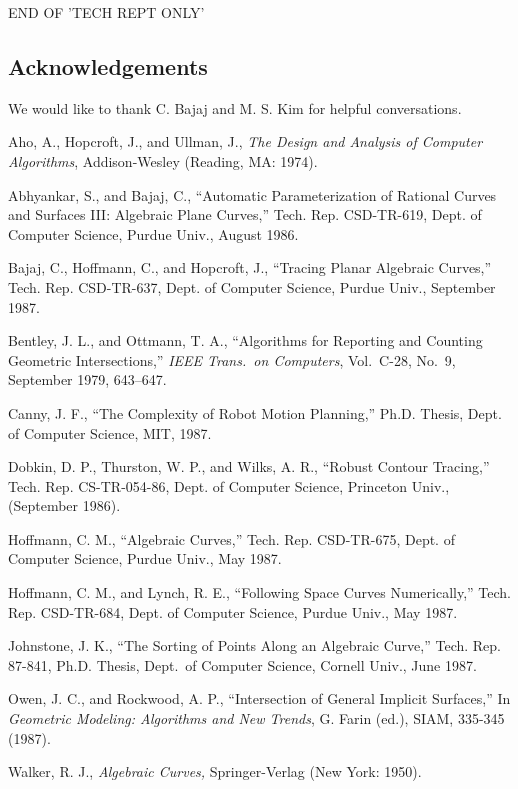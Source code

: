 END OF 'TECH REPT ONLY'
%
%
\fi

\SingleSpace
\subsection*{Acknowledgements}
We would like to thank C. Bajaj and M. S. Kim for helpful conversations.
%
\begin{thebibliography}{88}

 Aho, A., Hopcroft, J., and Ullman, J.,
{\it The Design and Analysis of Computer Algorithms},
Addison-Wesley (Reading, MA: 1974).

 Abhyankar, S., and Bajaj, C., 
``Automatic Parameterization of Rational Curves and Surfaces III:
Algebraic Plane Curves,''
Tech. Rep. CSD-TR-619, Dept. of Computer Science, Purdue Univ.,
August 1986.

 Bajaj, C., Hoffmann, C., and Hopcroft, J.,
``Tracing Planar Algebraic Curves,''
Tech. Rep. CSD-TR-637, Dept. of Computer Science, Purdue Univ.,
September 1987.

 Bentley, J. L., and Ottmann, T. A., 
``Algorithms for Reporting and Counting Geometric Intersections,''
{\it IEEE Trans.\ on Computers}, Vol.~C-28, No.~9, September 1979,
643--647.

 Canny, J. F.,
``The Complexity of Robot Motion Planning,''
Ph.D. Thesis, Dept. of Computer Science, MIT, 1987.

 Dobkin, D. P., Thurston, W. P., and Wilks, A. R.,
``Robust Contour Tracing,''
Tech. Rep. CS-TR-054-86, Dept. of Computer Science, Princeton Univ.,
(September 1986).

 Hoffmann, C. M., 
``Algebraic Curves,''
Tech. Rep. CSD-TR-675, Dept. of Computer Science, Purdue Univ.,
May 1987.

 Hoffmann, C. M., and Lynch, R. E., 
``Following Space Curves Numerically,''
Tech. Rep. CSD-TR-684, Dept. of Computer Science, Purdue Univ.,
May 1987.

 Johnstone, J. K.,
``The Sorting of Points Along an Algebraic Curve,''
Tech. Rep. 87-841, Ph.D. Thesis, Dept.\ of Computer Science, 
Cornell Univ., June 1987.


 Owen, J. C., and Rockwood, A. P.,
``Intersection of General Implicit Surfaces,''
In {\it Geometric Modeling: Algorithms and New Trends}, G. Farin (ed.),
SIAM, 335-345 (1987).

 Walker, R. J.,
{\it Algebraic Curves,}
Springer-Verlag (New York: 1950).

\end{thebibliography}
\clearpage
